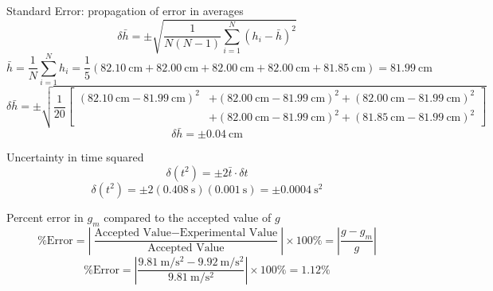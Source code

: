 \documentclass[12pt]{article}
\newcommand{\paren}[1]{\left(#1\right)}
\newcommand{\abs}[1]{\left\lvert#1\right\rvert}
\begin{document}
\begin{samplecalculations}
    	\begin{calculation}{Standard Error: propagation of error in averages}%
    		$$\delta\bar{h}=\pm\sqrt{\frac{1}{N(N-1)}\sum_{i=1}^N(h_i-\bar h)^2}$$
    		$$\bar h=\frac{1}{N}\sum_{i=1}^Nh_i=\frac15\paren{\SI{82.10}{\centi\meter}+\SI{82.00}{\centi\meter}+\SI{82.00}{\centi\meter}+\SI{82.00}{\centi\meter}+\SI{81.85}{\centi\meter}}=\SI{81.99}{\centi\meter}$$
    		$$\delta\bar h=\pm\sqrt{\frac{1}{20}\left[
	    			\begin{aligned}
	    				\paren{\SI{82.10}{\centi\meter} -\SI{81.99}{\centi\meter}}^2&+\paren{\SI{82.00}{\centi\meter}-\SI{81.99}{\centi\meter}}^2+\paren{\SI{82.00}{\centi\meter}-\SI{81.99}{\centi\meter}}^2\\
	    				 &+\paren{\SI{82.00}{\centi\meter}-\SI{81.99}{\centi\meter}}^2+\paren{\SI{81.85}{\centi\meter}-\SI{81.99}{\centi\meter}}^2
	    			\end{aligned}
    			\right]}$$
    		$$\delta\bar h=\pm\SI{0.04}{\centi\meter}$$
    	\end{calculation}
    
   		\pagebreak
   
    	\begin{calculation}{Uncertainty in time squared}%
    		$$\delta\paren{t^2}=\pm2\bar t\cdot\delta t$$
    		$$\delta\paren{t^2}=\pm2\paren{\SI{0.408}{\second}}\paren{\SI{0.001}{\second}}=\pm\SI{0.0004}{\second^2}$$
    	\end{calculation}
    
		\begin{calculation}{Percent error in $g_m$ compared to the accepted value of $g$}%
			$$\text{\% Error}=\abs{\frac{\text{Accepted Value}-\text{Experimental Value}}{\text{Accepted Value}}}\times100\%=\abs{\frac{g-g_m}{g}}$$
			$$\text{\% Error}=\abs{\frac{\SI{9.81}{\meter/\second^2}-\SI{9.92}{\meter/\second^2}}{{\SI{9.81}{\meter/\second^2}}}}\times100\%=1.12\%$$
		\end{calculation}
    \end{samplecalculations}

	
\end{document}
